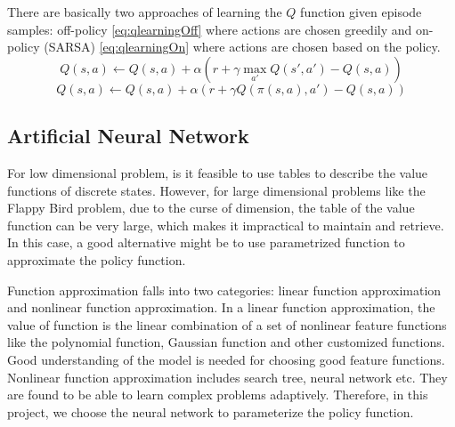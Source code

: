 \documentclass[conference,compsoc]{IEEEtran}
\begin{document}
There are basically two approaches of learning the $Q$ function given episode samples: off-policy \eqref{eq:qlearningOff} where actions are chosen greedily and on-policy (SARSA) \eqref{eq:qlearningOn} where actions are chosen based on the policy.
\begin{equation}\label{eq:qlearningOff}
Q(s,a) \leftarrow Q(s,a) + \alpha \left(r+\gamma \max_{a'} Q(s',a')-Q(s,a) \right)
\end{equation}
\begin{equation}\label{eq:qlearningOn}
Q(s,a) \leftarrow Q(s,a) + \alpha \left(r+\gamma Q(\pi(s,a),a')-Q(s,a) \right)
\end{equation}

\subsection{Artificial Neural Network}
For low dimensional problem, is it feasible to use tables to describe the value functions of discrete states. However, for large dimensional problems like the Flappy Bird problem, due to the curse of dimension, the table of the value function can be very large, which makes it impractical to maintain and retrieve. In this case, a good alternative might be to use parametrized function to approximate the policy function. \cite{sutton1999policy} \cite{riedmiller2005neural}

Function approximation falls into two categories: linear function approximation and nonlinear function approximation. In a linear function approximation, the value of function is the linear combination of a set of nonlinear feature functions like the polynomial function, Gaussian function and other customized functions. Good understanding of the model is needed for choosing good feature functions. Nonlinear function approximation includes search tree, neural network etc. They are found to be able to learn complex problems adaptively. Therefore, in this project, we choose the neural network to parameterize the policy function. 

\end{document}

